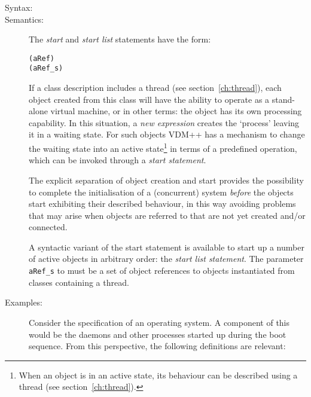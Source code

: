 \documentclass[\pformat,12pt]{article}
\newcommand{\vdmpp}{VDM++}
\begin{document}
\begin{description}
\item[Syntax:] 


    
\item[Semantics:] The {\it start} and {\it start list} statements have
the form:
  \begin{alltt}
    (aRef)
    (aRef_s)
  \end{alltt}

If a class description includes a thread (see
section~\ref{ch:thread}), each object created from this class will
have the ability to operate as a stand-alone virtual machine, or in
other terms: the object has its own processing capability.  In this
situation, a {\it new expression} creates the `process' leaving it in
a waiting state.  For such objects {\vdmpp} has a mechanism to change
the waiting state into an active state\footnote{When an object is in
an active state, its behaviour can be described using a thread (see
section~\ref{ch:thread}).}  in terms of a predefined operation, which
can be invoked through a {\it start statement}.

The explicit separation of object creation and start provides the
possibility to complete the initialisation of a (concurrent) system
{\it before} the objects start exhibiting their described behaviour,
in this way avoiding problems that may arise when objects are referred
to that are not yet created and/or connected.

A syntactic variant of the start statement is available to start up a
number of active objects in arbitrary order: the {\it start list
statement}. The parameter {\tt aRef\_s} to  must be a
set of object references to objects instantiated from classes
containing a thread.

\item[Examples:] 
Consider the specification of an operating system. A component of this
would be the daemons and other processes started up during the boot
sequence. From this perspective, the following definitions are
relevant:
\begin{alltt}


\end{alltt}
\end{description}
\end{document}
